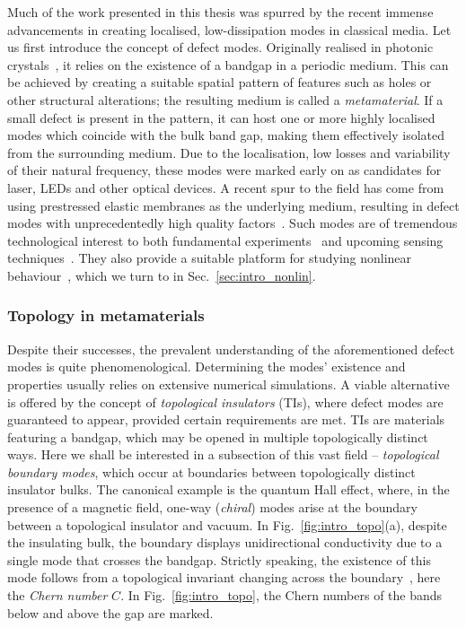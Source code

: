 Much of the work presented in this thesis was spurred by the recent immense advancements in creating localised, low-dissipation modes in classical media. Let us first introduce the concept of defect modes. Originally realised in photonic crystals~\cite{Joannopoulos_1997}, it relies on the existence of a bandgap in a periodic medium. This can be achieved by creating a suitable spatial pattern of features such as holes or other structural alterations; the resulting medium is called a \textit{metamaterial}. If a small defect is present in the pattern, it can host one or more highly localised modes which coincide with the bulk band gap, making them effectively isolated from the surrounding medium. Due to the localisation, low losses and variability of their natural frequency, these modes were marked early on as candidates for laser, LEDs and other optical devices. A recent spur to the field has come from using prestressed elastic membranes as the underlying medium, resulting in defect modes with unprecedentedly high quality factors~\cite{Tsaturyan_2017}. Such modes are of tremendous technological interest to both fundamental experiments~\cite{Mason_2019, Rossi_2018} and upcoming sensing techniques~\cite{Haelg_2022, Haelg_2021, Kosata_2020}. They also provide a suitable platform for studying nonlinear behaviour~\cite{Catalini_2021}, which we turn to in Sec.~\ref{sec:intro_nonlin}. 

\subsubsection{Topology in metamaterials}

Despite their successes, the prevalent understanding of the aforementioned defect modes is quite phenomenological. Determining the modes' existence and properties usually relies on extensive numerical simulations. A viable alternative is offered by the concept of \textit{topological insulators} (TIs), where defect modes are guaranteed to appear, provided certain requirements are met. TIs are materials featuring a bandgap, which may be opened in multiple topologically distinct ways. Here we shall be interested in a subsection of this vast field -- \textit{topological boundary modes}, which occur at boundaries between topologically distinct insulator bulks. The canonical example is the quantum Hall effect, where, in the presence of a magnetic field, one-way (\textit{chiral}) modes arise at the boundary between a topological insulator and vacuum. In Fig.~\ref{fig:intro_topo}(a), despite the insulating bulk, the boundary displays unidirectional conductivity due to a single mode that crosses the bandgap. Strictly speaking, the existence of this mode follows from a topological invariant changing across the boundary~\cite{Bernevig_2013}, here the \textit{Chern number} $C$. In Fig.~\ref{fig:intro_topo}, the Chern numbers of the bands below and above the gap are marked.

